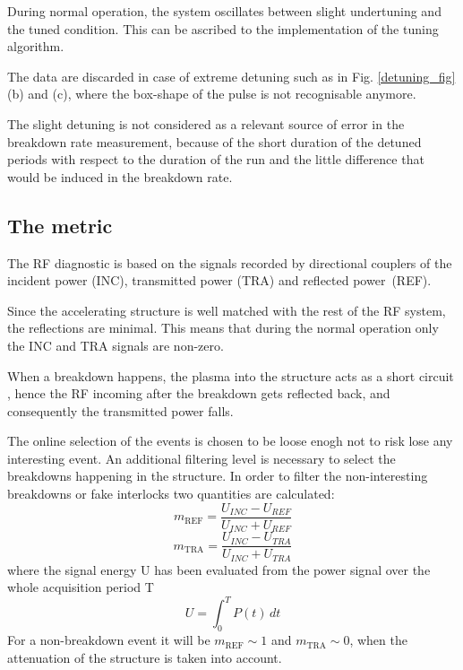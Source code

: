 During normal operation, the system oscillates between slight undertuning and the tuned condition. This can be ascribed to the implementation of the tuning algorithm.  

The data are discarded in case of extreme detuning such as in Fig. \ref{detuning_fig} (b) and (c), where the box-shape of the pulse is not recognisable anymore.

The slight detuning is not considered as a relevant source of error in the breakdown rate measurement,  because of the short duration of the detuned periods with respect to the duration of the run and the little difference that would be induced in the breakdown rate.



\subsection[The metric]{The metric}

The RF diagnostic is based on the signals recorded by directional couplers of the incident power (INC), transmitted power (TRA) and reflected power~(REF). 

Since the accelerating structure is well matched with the rest of the RF system, the reflections are minimal. This means that during the normal operation only the INC and TRA signals are non-zero.

When a breakdown happens, the plasma into the structure acts as a short circuit \cite{Degiovanni:2025952}, hence the RF incoming after the breakdown gets reflected back, and consequently the transmitted power falls. 

The online selection of the events is chosen to be loose enogh not to risk lose any interesting event. An additional filtering level is necessary to select the breakdowns happening in the structure. In order to filter the non-interesting breakdowns or fake interlocks two quantities are calculated:
\begin{equation}
m_{\text{REF}}  =  \frac{ U_{INC} -  U_{REF}   }{  U_{INC} + U_{REF}   }
\end{equation}
\begin{equation}
m_{\text{TRA}}  =  \frac{ U_{INC} -  U_{TRA}   }{  U_{INC} +  U_{TRA}   }
\end{equation}
where the signal energy U has been evaluated from the power signal over the whole acquisition period T
\begin{equation}
U = \int_0^T P(t) \, dt
\end{equation}
For a non-breakdown event it will be $m_{\text{REF}} \sim 1$ and $m_{\text{TRA}} \sim 0$, when the attenuation of the structure is taken into account.

